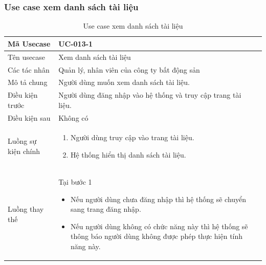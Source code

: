 \documentclass[12pt,a4paper]{article}
\begin{document}
    \subsubsection*{Use case xem danh sách tài liệu }
    \begin{table}[H]
        \centering
        \begin{tabular}{|p{3.5cm}|p{11.5cm}|c|}
            \hline
            Mã Usecase      & UC-013-1                                                      \\
            \hline
            Tên usecase     & Xem danh sách tài liệu                                        \\
            \hline
            Các tác nhân    & Quản lý, nhân viên của công ty bất động sản                   \\
            \hline
            Mô tả chung     & Người dùng muốn xem danh sách tài liệu.                       \\
            \hline

            Điều kiện trước & Người dùng đăng nhập vào hệ thống và truy cập trang tài liệu. \\
            \hline

            Điều kiện sau   & Không có                                                      \\
            \hline

            Luồng sự kiện chính & \vspace{-.8cm}\begin{enumerate}
                                                    \item Người dùng truy cập vào trang tài liệu.
                                                    \item Hệ thống hiển thị danh sách tài liệu.
            \end{enumerate}
            \\
            \hline
            Luồng thay thế & Tại bước 1\newline
            \vspace{-.8cm}\begin{itemize}
                              \item Nếu người dùng chưa đăng nhập thì hệ thống sẽ chuyển sang trang đăng nhập.
                              \item  Nếu người dùng không có chức năng này thì hệ thống sẽ thông báo người dùng không được phép thực hiện tính năng này.
            \end{itemize}

            \\    \hline
        \end{tabular}
        \caption{Use case xem danh sách tài liệu }
    \end{table}
\end{document}
